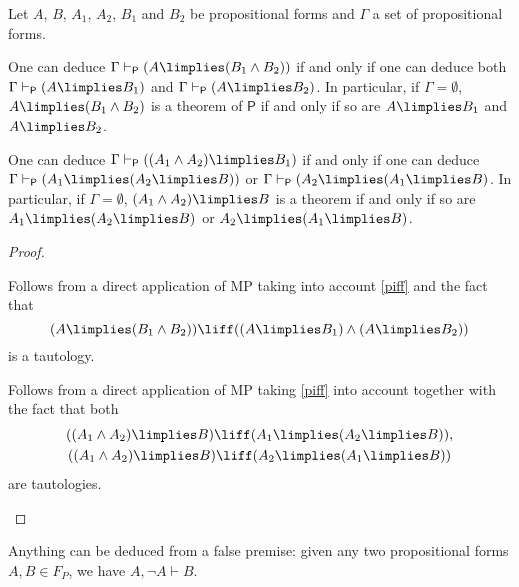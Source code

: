 \begin{proposition}
\label{impsystemp}
Let $A$, $B$, $A_1$, $A_2$, $B_1$ and $B_2$ be propositional forms and $\Gamma$ a set of propositional forms.
\begin{statements}
\item One can deduce $\Gamma \vdash_\mathsf{P} (A \limplies (B_1\land B_2))$ if and only if one can deduce both $\Gamma \vdash_\mathsf{P} (A\limplies B_1)$ and $\Gamma \vdash_\mathsf{P} (A\limplies B_2)$. In particular, if $\Gamma = \emptyset$, $A\limplies (B_1\land B_2)$ is a theorem of $\mathsf{P}$ if and only if so are $A\limplies B_1$ and $A \limplies B_2$.

\item One can deduce $\Gamma \vdash_\mathsf{P} ( (A_1\land A_2) \limplies B_1 )$ if and only if one can deduce $\Gamma \vdash_\mathsf{P} (A_1 \limplies (A_2 \limplies B))$ or $\Gamma \vdash_\mathsf{P} (A_2 \limplies (A_1 \limplies B)$. In particular, if $\Gamma = \emptyset$, $(A_1\land A_2) \limplies B$ is a theorem if and only if so are $A_1\limplies (A_2\limplies B)$ or $A_2 \limplies (A_1 \limplies B)$.
\end{statements}
\label{implesmani}
\end{proposition}

\begin{proof}
\begin{parlist}
\item Follows from a direct application of MP taking into account \ref{piff} and the fact that \[(A\limplies (B_1\land B_2)) \liff ((A\limplies B_1) \land (A\limplies B_2))\] is a tautology.
\item Follows from a direct application of MP taking \ref{piff} into account together with the fact that both
\begin{gather*}
((A_1 \land A_2)\limplies B) \liff (A_1 \limplies (A_2 \limplies B)),\\
((A_1 \land A_2)\limplies B) \liff (A_2 \limplies (A_1 \limplies B))
\end{gather*}
are tautologies.
\end{parlist}
\end{proof}

\begin{proposition}
\label{pexpprop}
Anything can be deduced from a false premise: given any two propositional forms $A,B\in F_P$, we have $A,\lnot A \vdash B$. 
\end{proposition}

